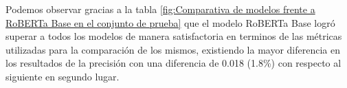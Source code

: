 
Podemos observar gracias a la tabla \ref{fig:Comparativa de modelos frente a RoBERTa Base en el conjunto de prueba} que el modelo RoBERTa Base logró superar a todos los modelos de manera satisfactoria en terminos de las métricas utilizadas para la comparación de los mismos, existiendo la mayor diferencia en los resultados de la precisión con una diferencia de 0.018 (1.8\%) con respecto al siguiente en segundo lugar.
